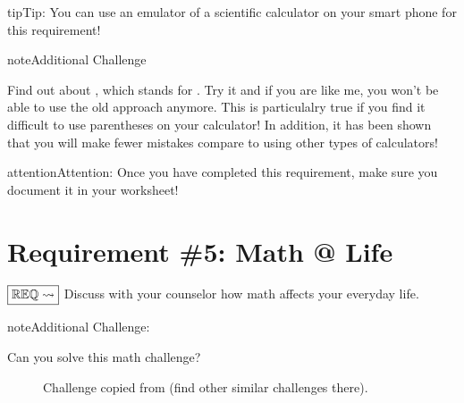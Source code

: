 \documentclass[letterpaper,10pt,english,openany,oneside]{sphinxmanual}
\let\sphinxpxdimen\pdfpxdimen\else\newdimen\sphinxpxdimen
\begin{document}
\begin{sphinxadmonition}{tip}{Tip:}
You can use an emulator of a scientific calculator on your smart phone for this requirement!
\end{sphinxadmonition}

\begin{sphinxadmonition}{note}{Additional Challenge}

Find out about , which stands for . Try it and if you are like me, you    won’t be able to use the old approach anymore. This is particulalry true if you find it difficult to use parentheses on your calculator! In addition, it has been shown that you will make fewer mistakes compare to using other types of calculators!
\end{sphinxadmonition}

\begin{figure}[htbp]
\centering

\noindent\sphinxincludegraphics[width=300\sphinxpxdimen]{{calculator}.png}
\end{figure}

\begin{sphinxadmonition}{attention}{Attention:}
Once you have completed this requirement, make sure you document it in your worksheet!
\end{sphinxadmonition}


\chapter{Requirement \#5: Math @ Life}
\label{\detokenize{requirement5:requirement-5-math-life}}\label{\detokenize{requirement5::doc}}
\(\boxed{\mathbb{REQ}\Large \rightsquigarrow}\) Discuss with your counselor how math affects your everyday life.

\begin{sphinxadmonition}{note}{Additional Challenge:}

Can you solve this math challenge?

\begin{figure}[H]
\centering
\capstart

\noindent\sphinxincludegraphics[width=400\sphinxpxdimen]{{three}.jpg}
\caption{Challenge copied from  (find other similar challenges there).}\label{\detokenize{requirement5:id1}}\end{figure}
\end{sphinxadmonition}
\end{document}
